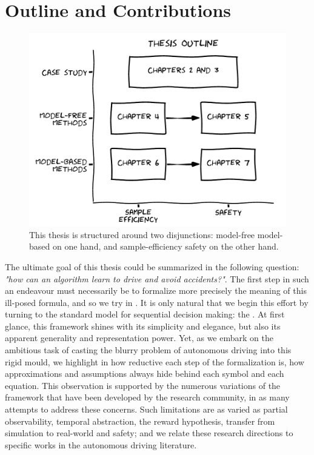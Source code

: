 \section{Outline and Contributions}

\begin{figure}[ht]
	\includegraphics[width=0.9\linewidth]{img/outline}
	\caption{This thesis is structured around two disjunctions: model-free \vs model-based on one hand, and sample-efficiency \vs safety on the other hand.}
	\label{fig:thesis-outline}
\end{figure}

The ultimate goal of this thesis could be summarized in the following question: \emph{"how can an algorithm learn to drive and avoid accidents?"}. The first step in such an endeavour must necessarily be to formalize more precisely the meaning of this ill-posed formula, and so we try in \textbf{}.
It is only natural that we begin this effort by turning to the standard model for sequential decision making: the . At first glance, this framework shines with its simplicity and elegance, but also its apparent generality and representation power. Yet, as we embark on the ambitious task of casting the blurry problem of autonomous driving into this rigid mould, we highlight in \textbf{} how reductive each step of the formalization is, how approximations and assumptions always hide behind each symbol and each equation. This observation is supported by the numerous variations of the framework that have been developed by the research community, in as many attempts to address these concerns. Such limitations are as varied as partial observability, temporal abstraction, the reward hypothesis, transfer from simulation to real-world and safety; and we relate these research directions to specific works in the autonomous driving literature.

